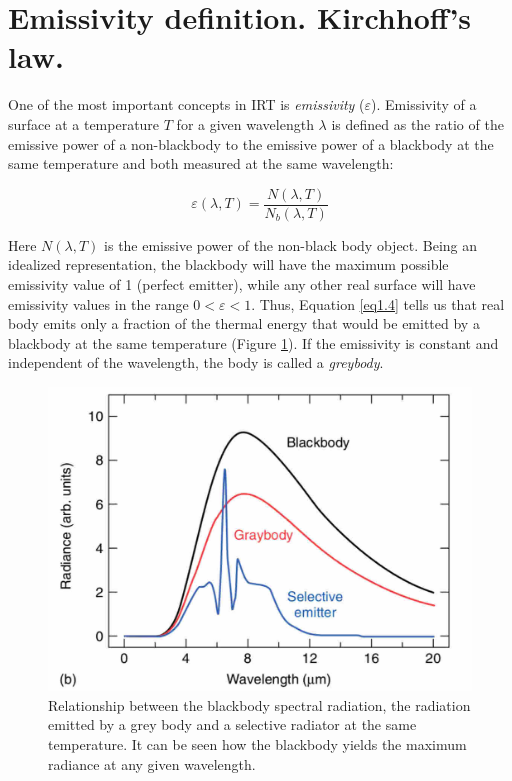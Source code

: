 	\section{Emissivity definition. Kirchhoff's law.}\label{section1.3}
		
		One of the most important concepts in IRT is \textit{emissivity} ($\varepsilon$). Emissivity of a surface at a temperature $T$ for a given wavelength $\lambda$ is defined as the ratio of the emissive power of a non-blackbody to the emissive power of a blackbody at the same temperature and both measured at the same wavelength:
		
		\begin{equation}\label{eq1.4}
			\varepsilon(\lambda,T)=\frac{N(\lambda,T)}{N_{b}(\lambda,T)}
		\end{equation}\bigskip
		
		Here $N(\lambda,T)$ is the emissive power of the non-black body object. Being an idealized representation, the blackbody will have the maximum possible emissivity value of 1 (perfect emitter), while any other real surface will have emissivity values in the range $0 < \varepsilon < 1$. Thus, Equation \ref{eq1.4} tells us that real body emits only a fraction of the thermal energy that would be emitted by a blackbody at the same temperature (Figure \ref{fig1.4}). If the emissivity is constant and independent of the wavelength, the body is called a \textit{greybody}.
		
		\begin{figure}[ht!]
			\centering
			\captionsetup{justification=centering,margin=2cm}
			\includegraphics[scale=0.4]{Figures/Chapter01/BlackAndGreybodyComparison.jpg}
			\caption{Relationship between the blackbody spectral radiation, the radiation emitted by a grey body and a selective radiator at the same temperature. It can be seen how the blackbody yields the maximum radiance at any given wavelength.}\label{fig1.4}
		\end{figure}
		

